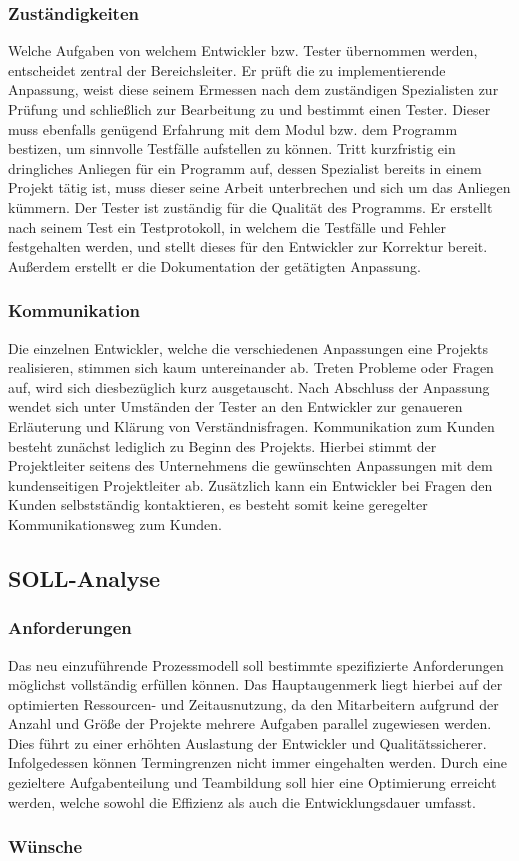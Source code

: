 \subsubsection{Zuständigkeiten}
Welche Aufgaben von welchem Entwickler bzw. Tester übernommen werden, entscheidet zentral der Bereichsleiter. Er prüft die zu implementierende Anpassung, weist diese seinem Ermessen nach dem zuständigen Spezialisten zur Prüfung und schließlich zur Bearbeitung zu und bestimmt einen Tester. Dieser muss ebenfalls genügend Erfahrung mit dem Modul bzw. dem Programm bestizen, um sinnvolle Testfälle aufstellen zu können. Tritt kurzfristig ein dringliches Anliegen für ein Programm auf, dessen Spezialist bereits in einem Projekt tätig ist, muss dieser seine Arbeit unterbrechen und sich um das Anliegen kümmern. Der Tester ist zuständig für die Qualität des Programms. Er erstellt nach seinem Test ein Testprotokoll, in welchem die Testfälle und Fehler festgehalten werden, und stellt dieses für den Entwickler zur Korrektur bereit. Außerdem erstellt er die Dokumentation der getätigten Anpassung.

\subsubsection{Kommunikation}
Die einzelnen Entwickler, welche die verschiedenen Anpassungen eine Projekts realisieren, stimmen sich kaum untereinander ab. Treten Probleme oder Fragen auf, wird sich diesbezüglich kurz ausgetauscht. Nach Abschluss der Anpassung wendet sich unter Umständen der Tester an den Entwickler zur genaueren Erläuterung und Klärung von Verständnisfragen. Kommunikation zum Kunden besteht zunächst lediglich zu Beginn des Projekts. Hierbei stimmt der Projektleiter seitens des Unternehmens die gewünschten Anpassungen mit dem kundenseitigen Projektleiter ab. Zusätzlich kann ein Entwickler bei Fragen den Kunden selbstständig kontaktieren, es besteht somit keine geregelter Kommunikationsweg zum Kunden.

\subsection{SOLL-Analyse}
\subsubsection{Anforderungen}
Das neu einzuführende Prozessmodell soll bestimmte spezifizierte Anforderungen möglichst vollständig erfüllen können. Das Hauptaugenmerk liegt hierbei auf der optimierten Ressourcen- und Zeitausnutzung, da den Mitarbeitern aufgrund der Anzahl und Größe der Projekte mehrere Aufgaben parallel zugewiesen werden. Dies führt zu einer erhöhten Auslastung der Entwickler und Qualitätssicherer. Infolgedessen können Termingrenzen nicht immer eingehalten werden. Durch eine gezieltere Aufgabenteilung und Teambildung soll hier eine Optimierung erreicht werden, welche sowohl die Effizienz als auch die Entwicklungsdauer umfasst.

\subsubsection{Wünsche}